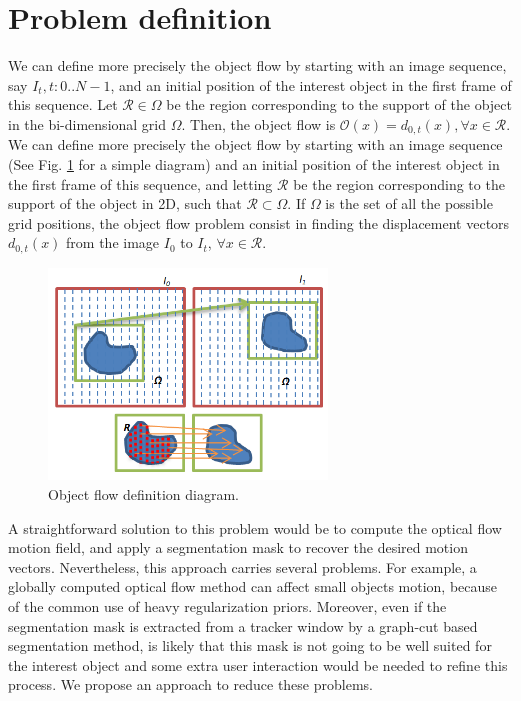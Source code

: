 \section{Problem definition}

We can define more precisely the object flow by starting with an image sequence, say $I_t, t:0..N-1$, and an initial 
position of the interest object in the first frame of this sequence. Let $\mathcal{R} \in \Omega$ be the region corresponding to the support of the object in the
bi-dimensional grid $\Omega$. Then, the object flow is $\mathcal{O}(x) = d_{0,t}(x), \forall x \in \mathcal{R}$.
We can define more precisely the object flow by starting with an image sequence (See Fig. \ref{diagram} for a simple diagram) and an initial 
position of the interest object in the first frame of this sequence, and letting $\mathcal{R}$ 
be the region corresponding to the support of the object in 2D, such that 
$\mathcal{R} \subset \Omega$. If $\Omega$ is the set of all the possible grid positions, 
the object flow problem consist in finding the displacement vectors $d_{0,t}(x)$ from the image $I_{0}$ to $I_{t}$, $\forall x \in \mathcal{R}$.

   \begin{figure}[bhp]
      \centering
      \includegraphics[width=0.66\textwidth]{../images/diagram.png}
      \caption{ Object flow definition diagram. }
      \label{diagram}
   \end{figure}

A straightforward solution to this problem would be to compute the optical flow motion field, and apply 
a segmentation mask to recover the desired motion vectors. Nevertheless, this approach carries several 
problems. For example, a globally computed optical flow method can affect small objects motion, because of 
the common use of heavy regularization priors. Moreover, even if the segmentation mask is extracted from a 
tracker window by a graph-cut based segmentation method, is likely that this mask is not going to be well suited for the 
interest object and some extra user interaction would be needed to refine this process. We propose an approach 
to reduce these problems.


